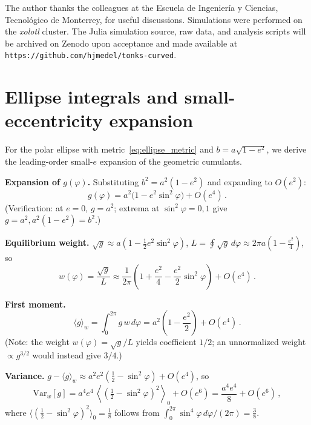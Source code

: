 \documentclass[aps,pre,twocolumn,superscriptaddress,longbibliography,floatfix]{revtex4-2}
\begin{document}
\begin{acknowledgments}
The author thanks the colleagues at the Escuela de Ingenier\'ia y Ciencias,
Tecnol\'ogico de Monterrey, for useful discussions.
Simulations were performed on the \emph{xolotl} cluster.
The Julia simulation source, raw data, and analysis scripts will be archived on Zenodo
upon acceptance and made available at \texttt{https://github.com/hjmedel/tonks-curved}.
\end{acknowledgments}

\appendix

\section{Ellipse integrals and small-eccentricity expansion}
\label{app:ellipse}

For the polar ellipse with metric~\eqref{eq:ellipse_metric} and $b=a\sqrt{1-e^2}$, we
derive the leading-order small-$e$ expansion of the geometric cumulants.

\textbf{Expansion of $g(\varphi)$.}
Substituting $b^2=a^2(1-e^2)$ and expanding to $O(e^2)$:
\begin{equation}
  g(\varphi) = a^2\bigl(1 - e^2\sin^2\!\varphi\bigr) + O(e^4)\,.
  \label{eq:g_expand}
\end{equation}
(Verification: at $e=0$, $g=a^2$; extrema at $\sin^2\!\varphi=0,1$ give $g=a^2, a^2(1-e^2)=b^2$.)

\textbf{Equilibrium weight.}
$\sqrt{g}\approx a(1-\tfrac{1}{2}e^2\sin^2\!\varphi)$,
$L=\oint\!\sqrt{g}\,d\varphi\approx 2\pi a(1-\tfrac{e^2}{4})$, so
\begin{equation}
  w(\varphi) = \frac{\sqrt{g}}{L} \approx \frac{1}{2\pi}
  \left(1 + \frac{e^2}{4} - \frac{e^2}{2}\sin^2\!\varphi\right) + O(e^4)\,.
\end{equation}

\textbf{First moment.}
\begin{equation}
  \langle g\rangle_w = \int_0^{2\pi}\!g\,w\,d\varphi
  = a^2\!\left(1 - \frac{e^2}{2}\right) + O(e^4)\,.
  \label{eq:g_mean_expand}
\end{equation}
(Note: the weight $w(\varphi)=\sqrt{g}/L$ yields coefficient $1/2$;
an unnormalized weight $\propto g^{3/2}$ would instead give $3/4$.)

\textbf{Variance.}
$g-\langle g\rangle_w \approx a^2 e^2(\tfrac{1}{2}-\sin^2\!\varphi)+O(e^4)$, so
\begin{equation}
  \mathrm{Var}_w[g] = a^4 e^4\,
  \left\langle\!\left(\tfrac{1}{2}-\sin^2\!\varphi\right)^2\!\right\rangle_0
  + O(e^6)
  = \frac{a^4 e^4}{8} + O(e^6)\,,
  \label{eq:var_expand}
\end{equation}
where $\langle(\tfrac{1}{2}-\sin^2\!\varphi)^2\rangle_0 = \tfrac{1}{8}$
follows from $\int_0^{2\pi}\sin^4\!\varphi\,d\varphi/(2\pi)=\tfrac{3}{8}$.
\end{document}
